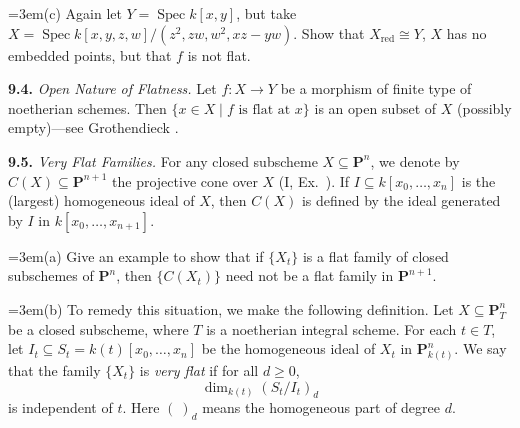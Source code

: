 {\noindent\hangindent=3em\hspace*{1.7em}(c) Again let $Y=\operatorname{Spec}k[x,y]$, but take $X=\operatorname{Spec}k[x,y,z,w]/\allowbreak(z^2,zw,w^2,xz-yw)$. Show that $X_{\mathrm{red}}\cong Y$, $X$ has no embedded points, but that $f$ is not flat.

\smallskip
\noindent\hypertarget{ex-III-9.4}{}\textbf{9.4.} \emph{Open Nature of Flatness.} Let $f\colon X\to Y$ be a morphism of finite type of noetherian schemes. Then $\{x\in X\mid f\text{ is flat at }x\}$ is an open subset of $X$ (possibly empty)---see Grothendieck .

\smallskip
\noindent\hypertarget{ex-III-9.5}{}\textbf{9.5.} \emph{Very Flat Families.} For any closed subscheme $X\subseteq\mathbf P^n$, we denote by $C(X)\subseteq\mathbf P^{n+1}$ the projective cone over $X$ (I, Ex.~). If $I\subseteq k[x_0,\ldots,x_n]$ is the (largest) homogeneous ideal of $X$, then $C(X)$ is defined by the ideal generated by $I$ in $k[x_0,\ldots,x_{n+1}]$.

\noindent\hangindent=3em\hspace*{1.7em}(a) Give an example to show that if $\{X_t\}$ is a flat family of closed subschemes of $\mathbf P^n$, then $\{C(X_t)\}$ need not be a flat family in $\mathbf P^{n+1}$.

\noindent\hangindent=3em\hspace*{1.7em}(b) To remedy this situation, we make the following definition. Let $X\subseteq\mathbf P^n_T$ be a closed subscheme, where $T$ is a noetherian integral scheme. For each $t\in T$, let $I_t\subseteq S_t=k(t)[x_0,\ldots,x_n]$ be the homogeneous ideal of $X_t$ in $\mathbf P_{k(t)}^n$. We say that the family $\{X_t\}$ is \emph{very flat} if for all $d\ge0$,
\[
\dim_{k(t)}(S_t/I_t)_d
\]
is independent of $t$. Here $(\ )_d$ means the homogeneous part of degree $d$.}
